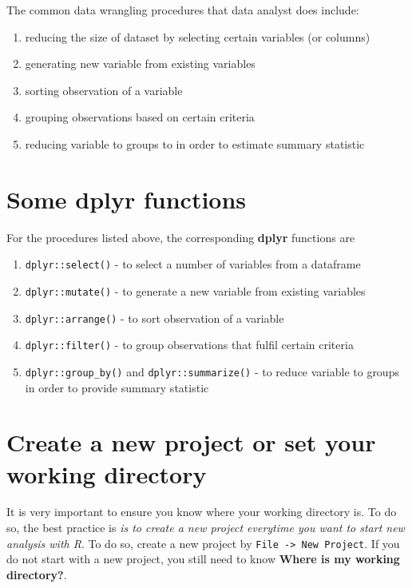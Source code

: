 \documentclass[
]{book}
\providecommand{\tightlist}{%
  \setlength{\itemsep}{0pt}\setlength{\parskip}{0pt}}
\begin{document}
The common data wrangling procedures that data analyst does include:

\begin{enumerate}
\def\labelenumi{\arabic{enumi}.}
\tightlist
\item
  reducing the size of dataset by selecting certain variables (or columns)
\item
  generating new variable from existing variables
\item
  sorting observation of a variable
\item
  grouping observations based on certain criteria
\item
  reducing variable to groups to in order to estimate summary statistic
\end{enumerate}

\hypertarget{some-dplyr-functions}{%
\section{\texorpdfstring{Some \textbf{dplyr} functions}{Some dplyr functions}}\label{some-dplyr-functions}}

For the procedures listed above, the corresponding \textbf{dplyr} functions are

\begin{enumerate}
\def\labelenumi{\arabic{enumi}.}
\tightlist
\item
  \texttt{dplyr::select()} - to select a number of variables from a dataframe
\item
  \texttt{dplyr::mutate()} - to generate a new variable from existing variables
\item
  \texttt{dplyr::arrange()} - to sort observation of a variable
\item
  \texttt{dplyr::filter()} - to group observations that fulfil certain criteria
\item
  \texttt{dplyr::group\_by()} and \texttt{dplyr::summarize()} - to reduce variable to groups in order to provide summary statistic
\end{enumerate}

\hypertarget{create-a-new-project-or-set-your-working-directory}{%
\section{Create a new project or set your working directory}\label{create-a-new-project-or-set-your-working-directory}}

It is very important to ensure you know where your working directory is. To do so, the best practice is \emph{is to create a new project everytime you want to start new analysis with R}. To do so, create a new project by \texttt{File\ -\textgreater{}\ New\ Project}. If you do not start with a new project, you still need to know \textbf{Where is my working directory?}.
\end{document}

